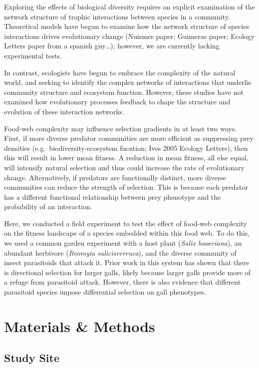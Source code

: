 \documentclass[]{elsarticle} %
\begin{document}
Exploring the effects of biological diversity requires an explicit
examination of the network structure of trophic interactions between
species in a community. Theoretical models have begun to examine how the
network structure of species interactions drives evolutionary change
(Nuismer paper; Guimeras paper; Ecology Letters paper from a spanish
guy\ldots{}); however, we are currently lacking experimental tests.

In contrast, ecologists have begun to embrace the complexity of the
natural world, and seeking to identify the complex networks of
interactions that underlie community structure and ecosystem function.
However, these studies have not examined how evolutionary processes
feedback to shape the structure and evolution of these interaction
networks.

Food-web complexity may influence selection gradients in at least two
ways. First, if more diverse predator communities are more efficient as
suppressing prey densities (e.g.~biodiversity-ecosystem fucntion; Ives
2005 Ecology Letters), then this will result in lower mean fitness. A
reduction in mean fitness, all else equal, will intensify natural
selection and thus could increase the rate of evolutionary change.
Alternatively, if predators are functionally distinct, more diverse
communities can reduce the strength of selection. This is because each
predator has a different functional relationship between prey phenotype
and the probability of an interaction.

Here, we conducted a field experiment to test the effect of food-web
complexity on the fitness landscape of a species embedded within this
food web. To do this, we used a common garden experiment with a host
plant (\emph{Salix hooeriana}), an abundant herbivore (\emph{Iteomyia
salicisverruca}), and the diverse community of insect parasitoids that
attack it. Prior work in this system has shown that there is directional
selection for larger galls, likely because larger galls provide more of
a refuge from parasitoid attack. However, there is also evidence that
different parasitoid species impose differential selection on gall
phenotypes.

\section{Materials \& Methods}\label{materials-methods}

\subsection{Study Site}\label{study-site}
\end{document}
